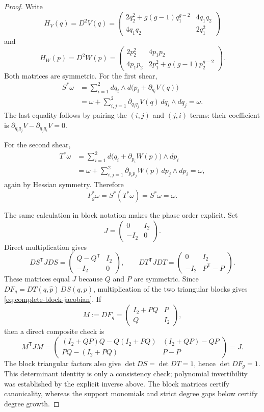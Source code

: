 \documentclass[11pt]{article}
\theoremstyle{remark}
\numberwithin{equation}{section}
\begin{document}
\begin{proof}
Write
\[
 H_V(q)=D^2V(q)
 =\begin{pmatrix}
 2q_2^2+g(g-1)q_1^{g-2}&4q_1q_2\\
 4q_1q_2&2q_1^2
 \end{pmatrix}
\]
and
\[
 H_W(p)=D^2W(p)
 =\begin{pmatrix}
 2p_2^2&4p_1p_2\\
 4p_1p_2&2p_1^2+g(g-1)p_2^{g-2}
 \end{pmatrix}.
\]
Both matrices are symmetric.  For the first shear,
\begin{align*}
 S^*\omega
 &=\sum_{i=1}^2dq_i\wedge
 d\bigl(p_i+\partial_{q_i}V(q)\bigr)\\
 &=\omega+\sum_{i,j=1}^2
 \partial_{q_iq_j}V(q)\,dq_i\wedge dq_j
 =\omega.
\end{align*}
The last equality follows by pairing the \((i,j)\) and \((j,i)\) terms:
their coefficient is
\(\partial_{q_iq_j}V-\partial_{q_jq_i}V=0\).

For the second shear,
\begin{align*}
 T^*\omega
 &=\sum_{i=1}^2d\bigl(q_i+\partial_{p_i}W(p)\bigr)\wedge dp_i\\
 &=\omega+\sum_{i,j=1}^2
 \partial_{p_ip_j}W(p)\,dp_j\wedge dp_i
 =\omega,
\end{align*}
again by Hessian symmetry.  Therefore
\[
 F_g^*\omega=S^*(T^*\omega)=S^*\omega=\omega.
\]

The same calculation in block notation makes the phase order explicit.  Set
\[
 J=\begin{pmatrix}0&I_2\\-I_2&0\end{pmatrix}.
\]
Direct multiplication gives
\[
 DS^{\mathsf T}JDS
 =\begin{pmatrix}Q-Q^{\mathsf T}&I_2\\-I_2&0\end{pmatrix},
 \qquad
 DT^{\mathsf T}JDT
 =\begin{pmatrix}0&I_2\\-I_2&P^{\mathsf T}-P\end{pmatrix}.
\]
These matrices equal \(J\) because \(Q\) and \(P\) are symmetric.  Since
\(DF_g=DT(q,\widehat p)\,DS(q,p)\), multiplication of the two triangular
blocks gives \eqref{eq:complete-block-jacobian}.  If
\[
 M:=DF_g=\begin{pmatrix}I_2+PQ&P\\Q&I_2\end{pmatrix},
\]
then a direct composite check is
\[
 M^{\mathsf T}JM
 =
 \begin{pmatrix}
 (I_2+QP)Q-Q(I_2+PQ)&(I_2+QP)-QP\\
 PQ-(I_2+PQ)&P-P
 \end{pmatrix}
 =J.
\]
The block triangular factors also give
\(\det DS=\det DT=1\), hence \(\det DF_g=1\).  This determinant identity is
only a consistency check; polynomial invertibility was established by the
explicit inverse above.  The block matrices certify canonicality, whereas
the support monomials and strict degree gaps below certify degree growth.


\end{proof}
\end{document}
